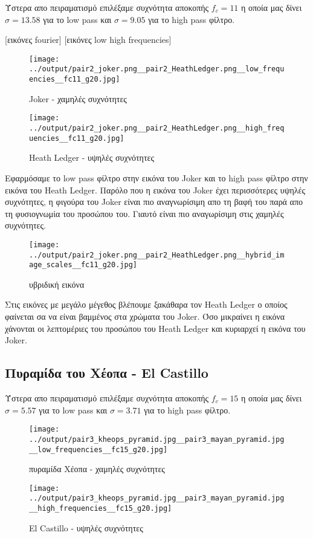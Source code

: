 \documentclass[11pt]{scrartcl} %
\begin{document}
Ύστερα απο πειραματισμό επιλέξαμε συχνότητα αποκοπής $f_c = 11$ η οποία μας δίνει $\sigma = 13.58$ για το low pass και $\sigma = 9.05$ για το high pass φίλτρο.

[εικόνες fourier]
[εικόνες low high frequencies]
\begin{figure}[H]
  \begin{minipage}[c]{9cm}
    \texttt{[image: ../output/pair2\_joker.png\_\_pair2\_HeathLedger.png\_\_low\_frequencies\_\_fc11\_g20.jpg]}
    \caption{Joker - χαμηλές συχνότητες}
  \end{minipage}
  \begin{minipage}[c]{9cm}
    \texttt{[image: ../output/pair2\_joker.png\_\_pair2\_HeathLedger.png\_\_high\_frequencies\_\_fc11\_g20.jpg]}
    \caption{Heath Ledger - υψηλές συχνότητες}
  \end{minipage}
\end{figure}

Εφαρμόσαμε το low pass φίλτρο στην εικόνα του Joker και το high pass φίλτρο στην εικόνα του Heath Ledger. Παρόλο που η εικόνα του Joker έχει περισσότερες υψηλές συχνότητες, η φιγούρα του Joker είναι πιο αναγνωρίσιμη απο τη βαφή του παρά απο τη φυσιογνωμία του προσώπου του. Γιαυτό είναι πιο αναγωρίσιμη στις χαμηλές συχνότητες.

\begin{figure}[H]
  \texttt{[image: ../output/pair2\_joker.png\_\_pair2\_HeathLedger.png\_\_hybrid\_image\_scales\_\_fc11\_g20.jpg]}
  \caption{υβριδική εικόνα}
\end{figure}

Στις εικόνες με μεγάλο μέγεθος βλέπουμε ξακάθαρα τον Heath Ledger ο οποίος φαίνεται σα να είναι βαμμένος στα χρώματα του Joker. Όσο μικραίνει η εικόνα χάνονται οι λεπτομέριες του προσώπου του Heath Ledger και κυριαρχεί η εικόνα του Joker.

\subsection{Πυραμίδα του Χέοπα - El Castillo}

Ύστερα απο πειραματισμό επιλέξαμε συχνότητα αποκοπής $f_c = 15$ η οποία μας δίνει $\sigma = 5.57$ για το low pass και $\sigma = 3.71$ για το high pass φίλτρο.

\begin{figure}[H]
  \begin{minipage}[c]{9cm}
    \texttt{[image: ../output/pair3\_kheops\_pyramid.jpg\_\_pair3\_mayan\_pyramid.jpg\_\_low\_frequencies\_\_fc15\_g20.jpg]}
    \caption{πυραμίδα Χέοπα - χαμηλές συχνότητες}
  \end{minipage}
  \begin{minipage}[c]{9cm}
    \texttt{[image: ../output/pair3\_kheops\_pyramid.jpg\_\_pair3\_mayan\_pyramid.jpg\_\_high\_frequencies\_\_fc15\_g20.jpg]}
    \caption{El Castillo - υψηλές συχνότητες}
  \end{minipage}
\end{figure}
\end{document}
